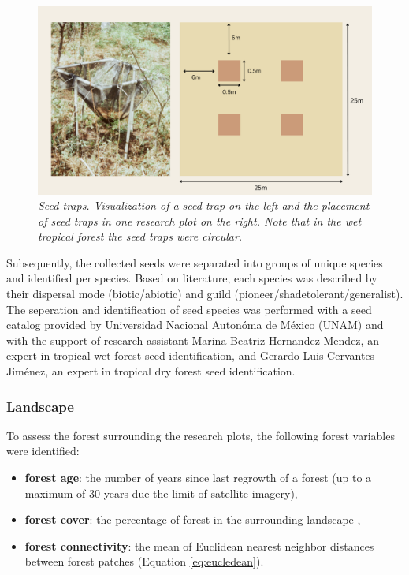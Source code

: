 \begin{figure}[htbp]
\centering
\includegraphics[width=\linewidth, keepaspectratio]{Report/figures/02_seedtraps.pdf}
\caption{\textit{Seed traps. Visualization of a seed trap on the left and the placement of seed traps in one research plot on the right. Note that in the wet tropical forest the seed traps were circular.}}
\label{fig:st}
\end{figure}

Subsequently, the collected seeds were separated into groups of unique species and identified per species. Based on literature, each species was described by their dispersal mode (biotic/abiotic) and guild (pioneer/shadetolerant/generalist). The seperation and identification of seed species was performed with a seed catalog provided by Universidad Nacional Autonóma de México (UNAM) and with the support of research assistant Marina Beatriz Hernandez Mendez, an expert in tropical wet forest seed identification, and Gerardo Luis Cervantes Jiménez, an expert in tropical dry forest seed identification. 


\subsubsection{Landscape}

To  assess the forest surrounding the research plots, the following forest variables were identified:
\begin{itemize}
    \item \textbf{forest age}: the number of years since last regrowth of a forest (up to a maximum of 30 years due the limit of satellite imagery),
    \item \textbf{forest cover}: the percentage of forest in the surrounding landscape \citep{hesselbarthLandscapemetricsOpensourceTool2019}, 
    \item \textbf{forest connectivity}: the mean of Euclidean nearest neighbor distances between forest patches (Equation \ref{eq:eucledean}). 
\end{itemize}

